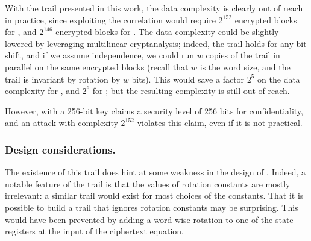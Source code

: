 With the trail presented in this work, the data complexity is clearly
out of reach in practice, since exploiting the correlation would require
$2^{152}$ encrypted blocks for , and $2^{146}$
encrypted blocks for . The data complexity could be
slightly lowered by leveraging multilinear cryptanalysis; indeed, the
trail holds for any bit shift, and if we assume independence, we could
run $w$ copies of the trail in parallel on the same encrypted blocks
(recall that $w$ is the word size, and the trail is invariant by
rotation by $w$ bits). This would save a factor $2^5$ on the data
complexity for , and $2^6$ for ; but
the resulting complexity is still out of reach.

However,  with a 256-bit key claims a security level
of 256 bits for confidentiality, and an attack with complexity $2^{152}$
violates this claim, even if it is not practical.  

\subsubsection{Design considerations.}
The existence of this trail does hint at some weakness in the
design of . Indeed, a notable feature of the trail is that
the values of rotation constants are mostly irrelevant: a similar trail
would exist for most choices of the constants. That it is possible to
build a trail that ignores rotation constants may be surprising. This
would have been prevented by adding a word-wise rotation to one of the
state registers at the input of the ciphertext equation.

